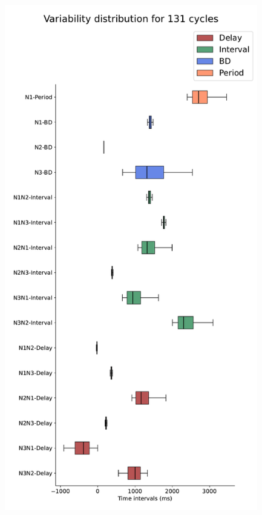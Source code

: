 \begin{figure}[hbt!]
	\begin{minipage}[b]{0.45\textwidth}
		\centering
		\includegraphics[width=\textwidth]{invariants/data/MODEL/n3t_driven/images/3phases/_boxplot.pdf}

\end{minipage}
\end{figure}

